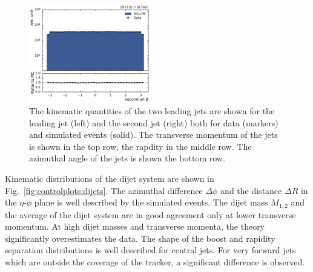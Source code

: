 \begin{figure}[htbp]
    \includegraphics[width=0.47\textwidth]{figures/measurement/jet_quantities_jet2phi.pdf}
    \caption[Kinematic quantities of the jets]{The 
        kinematic quantities of the two leading jets are shown for the leading
        jet (left) and the second jet (right) both for data (markers) and
        simulated events (solid). The transverse momentum of the
        jets is shown in the top row, the rapdity in the middle row. The
        azimuthal angle of the jets is shown the bottom row.}
    \label{fig:controlplots:kinematic}
\end{figure}

Kinematic distributions of the dijet system are shown in
Fig.~\ref{fig:controlplots:dijets}. The azimuthal difference $\Delta\phi$ and
the distance $\Delta R$ in the $\eta$-$\phi$ plane is well described by the
simulated events. The dijet mass $M_{1,2}$ and the average \pt of the dijet
system are in good agreement only at lower transverse momentum. At high dijet
masses and transverse momenta, the theory significantly overestimates the data.
The shape of the boost and rapidity separation distributions is well described
for central jets. For very forward jets which are outside the coverage of the
tracker, a significant difference is observed.

